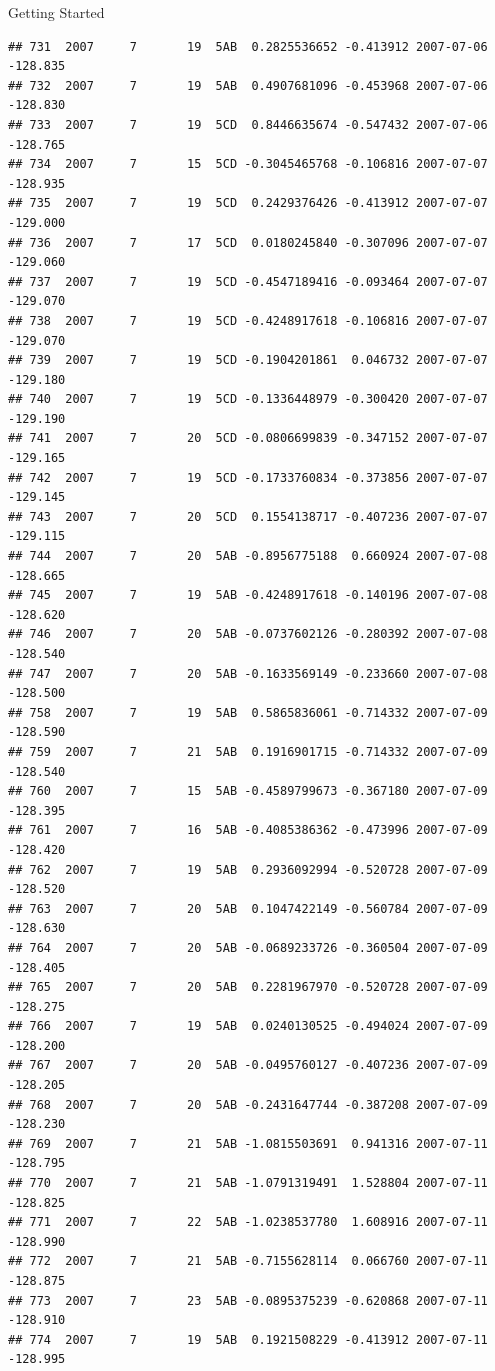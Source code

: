 \documentclass[
  ignorenonframetext,
]{beamer}
\begin{document}
\begin{frame}[fragile]{Getting Started}
\begin{verbatim}
## 731  2007     7       19  5AB  0.2825536652 -0.413912 2007-07-06 -128.835
## 732  2007     7       19  5AB  0.4907681096 -0.453968 2007-07-06 -128.830
## 733  2007     7       19  5CD  0.8446635674 -0.547432 2007-07-06 -128.765
## 734  2007     7       15  5CD -0.3045465768 -0.106816 2007-07-07 -128.935
## 735  2007     7       19  5CD  0.2429376426 -0.413912 2007-07-07 -129.000
## 736  2007     7       17  5CD  0.0180245840 -0.307096 2007-07-07 -129.060
## 737  2007     7       19  5CD -0.4547189416 -0.093464 2007-07-07 -129.070
## 738  2007     7       19  5CD -0.4248917618 -0.106816 2007-07-07 -129.070
## 739  2007     7       19  5CD -0.1904201861  0.046732 2007-07-07 -129.180
## 740  2007     7       19  5CD -0.1336448979 -0.300420 2007-07-07 -129.190
## 741  2007     7       20  5CD -0.0806699839 -0.347152 2007-07-07 -129.165
## 742  2007     7       19  5CD -0.1733760834 -0.373856 2007-07-07 -129.145
## 743  2007     7       20  5CD  0.1554138717 -0.407236 2007-07-07 -129.115
## 744  2007     7       20  5AB -0.8956775188  0.660924 2007-07-08 -128.665
## 745  2007     7       19  5AB -0.4248917618 -0.140196 2007-07-08 -128.620
## 746  2007     7       20  5AB -0.0737602126 -0.280392 2007-07-08 -128.540
## 747  2007     7       20  5AB -0.1633569149 -0.233660 2007-07-08 -128.500
## 758  2007     7       19  5AB  0.5865836061 -0.714332 2007-07-09 -128.590
## 759  2007     7       21  5AB  0.1916901715 -0.714332 2007-07-09 -128.540
## 760  2007     7       15  5AB -0.4589799673 -0.367180 2007-07-09 -128.395
## 761  2007     7       16  5AB -0.4085386362 -0.473996 2007-07-09 -128.420
## 762  2007     7       19  5AB  0.2936092994 -0.520728 2007-07-09 -128.520
## 763  2007     7       20  5AB  0.1047422149 -0.560784 2007-07-09 -128.630
## 764  2007     7       20  5AB -0.0689233726 -0.360504 2007-07-09 -128.405
## 765  2007     7       20  5AB  0.2281967970 -0.520728 2007-07-09 -128.275
## 766  2007     7       19  5AB  0.0240130525 -0.494024 2007-07-09 -128.200
## 767  2007     7       20  5AB -0.0495760127 -0.407236 2007-07-09 -128.205
## 768  2007     7       20  5AB -0.2431647744 -0.387208 2007-07-09 -128.230
## 769  2007     7       21  5AB -1.0815503691  0.941316 2007-07-11 -128.795
## 770  2007     7       21  5AB -1.0791319491  1.528804 2007-07-11 -128.825
## 771  2007     7       22  5AB -1.0238537780  1.608916 2007-07-11 -128.990
## 772  2007     7       21  5AB -0.7155628114  0.066760 2007-07-11 -128.875
## 773  2007     7       23  5AB -0.0895375239 -0.620868 2007-07-11 -128.910
## 774  2007     7       19  5AB  0.1921508229 -0.413912 2007-07-11 -128.995

\end{verbatim}
\end{frame}
\end{document}
